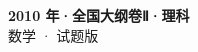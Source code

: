 \documentclass[zihao=-4, a4paper]{ctexart}
\begin{document}
\begin{center}
  {\Large\bfseries 2010 年·全国大纲卷Ⅱ·理科}\\[4pt]
  {\large 数学 · 试题版}
\end{center}
\medskip
{}

\end{document}
